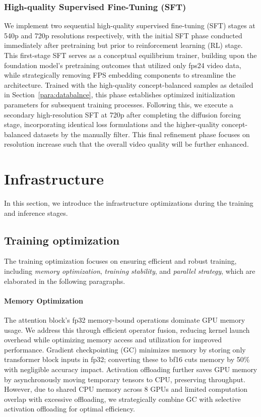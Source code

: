 \documentclass{article}
\begin{document}
{\subsubsection{High-quality Supervised Fine-Tuning (SFT)}
\label{subsec:SFT}
We implement two sequential high-quality supervised fine-tuning (SFT) stages at 540p and 720p resolutions respectively, with the initial SFT phase conducted immediately after pretraining but prior to reinforcement learning (RL) stage. This first-stage SFT serves as a conceptual equilibrium trainer, building upon the foundation model's pretraining outcomes that utilized only fps24 video data, while strategically removing FPS embedding components to streamline the architecture. Trained with the high-quality concept-balanced samples as detailed in Section~\ref{para:databalnce}, this phase establishes optimized initialization parameters for subsequent training processes. Following this, we execute a secondary high-resolution SFT at 720p after completing the diffusion forcing stage, incorporating identical loss formulations and the higher-quality concept-balanced datasets by the manually filter. This final refinement phase focuses on resolution increase such that the overall video quality will be further enhanced.
\section{Infrastructure}
\label{subsec:infrastructure}
In this section, we introduce the infrastructure optimizations during the training and inference stages.
\subsection{Training optimization}
The training optimization focuses on ensuring efficient and robust training, including \emph{memory optimization}, \emph{training stability}, and \emph{parallel strategy}, which are elaborated in the following paragraphs.
\paragraph{Memory Optimization}
The attention block's fp32 memory-bound operations dominate GPU memory usage. We address this through efficient operator fusion, reducing kernel launch overhead while optimizing memory access and utilization for improved performance. Gradient checkpointing (GC) minimizes memory by storing only transformer block inputs in fp32; converting these to bf16 cuts memory by 50\% with negligible accuracy impact. Activation offloading further saves GPU memory by asynchronously moving temporary tensors to CPU, preserving throughput. However, due to shared CPU memory across 8 GPUs and limited computation overlap with excessive offloading, we strategically combine GC with selective activation offloading for optimal efficiency.
}
\end{document}
